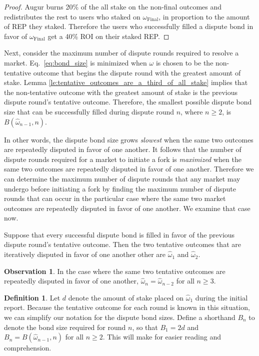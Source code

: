 \documentclass[floatfix,reprint,nofootinbib,amsmath,amssymb,epsfig,pre,floats,letterpaper,groupedaffiliation]{revtex4-1}
\theoremstyle{definition}
\newtheorem{observation}{Observation}
\theoremstyle{definition}
\newtheorem{definition}{Definition}
\begin{document}
\begin{appendix}
\begin{proof}
Augur burns 20\% of the all stake on the non-final outcomes and redistributes the rest to users who staked on $\omega_{\mathrm{Final}}$, in proportion to the amount of REP they staked. Therefore the users who successfully filled a dispute bond in favor of $\omega_{\mathrm{Final}}$ get a 40\% ROI on their staked REP.
\end{proof}

Next, consider the maximum number of dispute rounds required to resolve a market.  Eq.~\ref{eq:bond_size} is minimized when $\omega$ is chosen to be the non-tentative outcome that begins the dispute round with the greatest amount of stake.  Lemma \ref{le:tentative_outcomes_are_a_third_of_all_stake} implies that the non-tentative outcome with the greatest amount of stake is the previous dispute round's tentative outcome.  Therefore, the smallest possible dispute bond size that can be successfully filled during dispute round $n$, where $n \geq 2$, is $B(\hat{\omega}_{n-1},n)$.

In other words, the dispute bond size grows \emph{slowest} when the same two outcomes are repeatedly disputed in favor of one another.  It follows that the number of dispute rounds required for a market to initiate a fork is \emph{maximized} when the same two outcomes are repeatedly disputed in favor of one another.  Therefore we can determine the maximum number of dispute rounds that any market may undergo before initiating a fork by finding the maximum number of dispute rounds that can occur in the particular case where the same two market outcomes are repeatedly disputed in favor of one another.  We examine that case now.

Suppose that every successful dispute bond is filled in favor of the previous dispute round's tentative outcome.  Then the two tentative outcomes that are iteratively disputed in favor of one another other are $\hat{\omega}_{1}$ and $\hat{\omega}_{2}$.

\begin{observation}\label{ob:tentative_outcomes_repeat}
In the case where the same two tentative outcomes are repeatedly disputed in favor of one another, $\hat{\omega}_{n} = \hat{\omega}_{n-2}$ for all $n \geq 3$.
\end{observation}

\begin{definition}
Let $d$ denote the amount of stake placed on $\hat{\omega}_{1}$ during the initial report.  Because the tentative outcome for each round is known in this situation, we can simplify our notation for the dispute bond sizes.  Define a shorthand $B_n$ to denote the bond size required for round $n$, so that $B_{1} = 2d$ and $B_{n} = B(\hat{\omega}_{n-1},n)$ for all $n \geq 2$.  This will make for easier reading and comprehension.
\end{definition}


\end{appendix}
\end{document}
